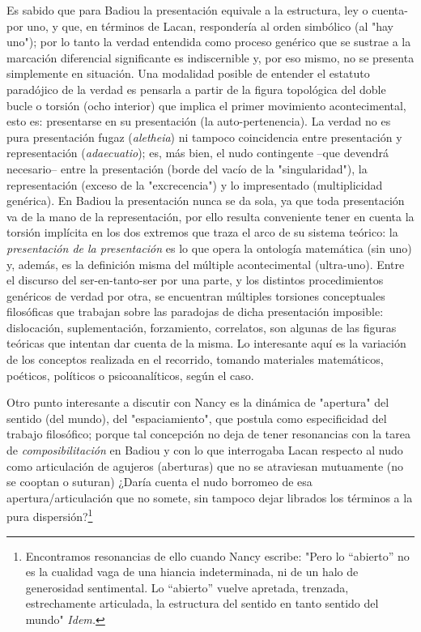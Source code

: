 \documentclass{book}
\begin{document}
Es sabido que para Badiou la presentación equivale a la estructura, ley
o cuenta-por uno, y que, en términos de Lacan, respondería al orden
simbólico (al "hay uno"); por lo tanto la verdad entendida como proceso
genérico que se sustrae a la marcación diferencial significante es
indiscernible y, por eso mismo, no se presenta simplemente en situación.
Una modalidad posible de entender el estatuto paradójico de la verdad es
pensarla a partir de la figura topológica del doble bucle o torsión
(ocho interior) que implica el primer movimiento acontecimental, esto
es: presentarse en su presentación (la auto-pertenencia). La verdad no
es pura presentación fugaz (\emph{aletheia}) ni tampoco coincidencia
entre presentación y representación (\emph{adaecuatio}); es, más bien,
el nudo contingente --que devendrá necesario-- entre la presentación
(borde del vacío de la "singularidad"), la representación (exceso de la
"excrecencia") y lo impresentado (multiplicidad genérica). En Badiou la
presentación nunca se da sola, ya que toda presentación va de la mano de
la representación, por ello resulta conveniente tener en cuenta la
torsión implícita en los dos extremos que traza el arco de su sistema
teórico: la \emph{presentación de la presentación} es lo que opera la
ontología matemática (sin uno) y, además, es la definición misma del
múltiple acontecimental (ultra-uno). Entre el discurso del
ser-en-tanto-ser por una parte, y los distintos procedimientos genéricos
de verdad por otra, se encuentran múltiples torsiones conceptuales
filosóficas que trabajan sobre las paradojas de dicha presentación
imposible: dislocación, suplementación, forzamiento, correlatos, son
algunas de las figuras teóricas que intentan dar cuenta de la misma. Lo
interesante aquí es la variación de los conceptos realizada en el
recorrido, tomando materiales matemáticos, poéticos, políticos o
psicoanalíticos, según el caso.

Otro punto interesante a discutir con Nancy es la dinámica de "apertura"
del sentido (del mundo), del "espaciamiento", que postula como
especificidad del trabajo filosófico; porque tal concepción no deja de
tener resonancias con la tarea de \emph{composibilitación} en Badiou y
con lo que interrogaba Lacan respecto al nudo como articulación de
agujeros (aberturas) que no se atraviesan mutuamente (no se cooptan o
suturan) ¿Daría cuenta el nudo borromeo de esa apertura/articulación que
no somete, sin tampoco dejar librados los términos a la pura
dispersión?\footnote{Encontramos resonancias de ello cuando Nancy
  escribe: "Pero lo ``abierto'' no es la cualidad vaga de una hiancia
  indeterminada, ni de un halo de generosidad sentimental. Lo
  ``abierto'' vuelve apretada, trenzada, estrechamente articulada, la
  estructura del sentido en tanto sentido del mundo" \emph{Idem.}}
\end{document}
